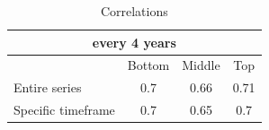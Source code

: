 \begin{table}[h!]
\centering
\caption{Correlations}
\begin{tabular}{|l|c|c|c|}
\hline
\multicolumn{4}{|c|}{every 4 years} \\ \hline
& Bottom & Middle & Top \\ \hline
Entire series & 0.7 & 0.66 & 0.71 \\ \hline
Specific timeframe & 0.7 & 0.65 & 0.7 \\ \hline
\end{tabular}
\end{table}
